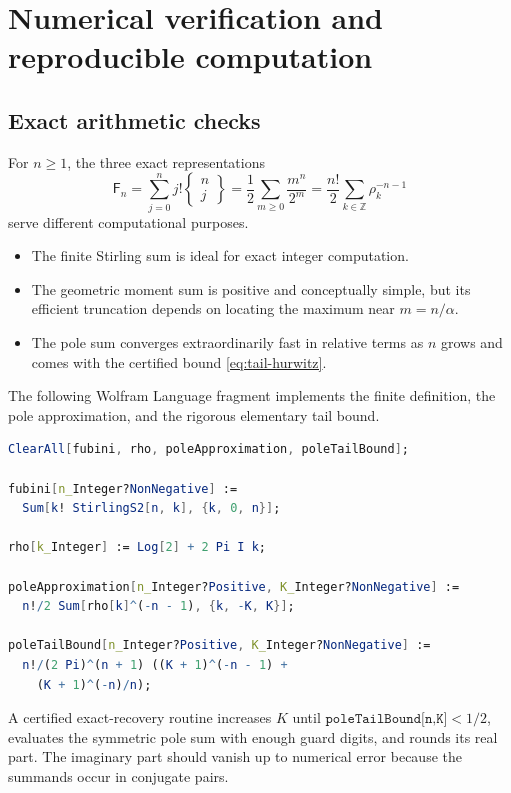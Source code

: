 \documentclass[11pt,a4paper]{article}
\theoremstyle{definition}
\theoremstyle{remark}
\newcommand{\Fub}{\mathsf F}
\newcommand{\Stirling}[2]{\left\{\!\!\begin{matrix}#1\\#2\end{matrix}\!\!\right\}}
\newcommand{\Z}{\mathbb Z}
\begin{document}
\section{Numerical verification and reproducible computation}

\subsection{Exact arithmetic checks}

For \(n\ge1\), the three exact representations
\begin{equation}\label{eq:three-exact}
 \Fub_n
 =\sum_{j=0}^n j!\Stirling{n}{j}
 =\frac12\sum_{m\ge0}\frac{m^n}{2^m}
 =\frac{n!}{2}\sum_{k\in\Z}\rho_k^{-n-1}
\end{equation}
serve different computational purposes.

\begin{itemize}
\item The finite Stirling sum is ideal for exact integer computation.
\item The geometric moment sum is positive and conceptually simple, but its
      efficient truncation depends on locating the maximum near \(m=n/\alpha\).
\item The pole sum converges extraordinarily fast in relative terms as \(n\)
      grows and comes with the certified bound \eqref{eq:tail-hurwitz}.
\end{itemize}

The following Wolfram Language fragment implements the finite definition, the
pole approximation, and the rigorous elementary tail bound.

\begin{lstlisting}[language=Mathematica]
ClearAll[fubini, rho, poleApproximation, poleTailBound];

fubini[n_Integer?NonNegative] :=
  Sum[k! StirlingS2[n, k], {k, 0, n}];

rho[k_Integer] := Log[2] + 2 Pi I k;

poleApproximation[n_Integer?Positive, K_Integer?NonNegative] :=
  n!/2 Sum[rho[k]^(-n - 1), {k, -K, K}];

poleTailBound[n_Integer?Positive, K_Integer?NonNegative] :=
  n!/(2 Pi)^(n + 1) ((K + 1)^(-n - 1) +
    (K + 1)^(-n)/n);
\end{lstlisting}

A certified exact-recovery routine increases \(K\) until
\(
 \texttt{poleTailBound[n,K]}<1/2
\), evaluates the symmetric pole sum with enough guard digits, and rounds its
real part.  The imaginary part should vanish up to numerical error because the
summands occur in conjugate pairs.
\end{document}

